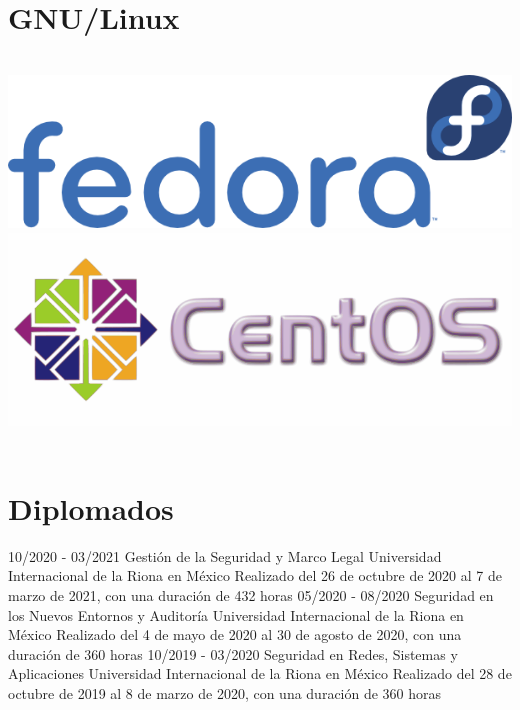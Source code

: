 \documentclass[]{friggeri-cv}
\begin{document}
\begin{aside}
    ~
    \section{GNU/Linux}
    ~
    \includegraphics[scale=0.12]{img/fedora}
    \includegraphics[scale=0.12]{img/centos}
    ~
\end{aside}
\section {Diplomados}
\begin{entrylist}
  \entry
  {10/2020 - 03/2021}
  {Gestión de la Seguridad y Marco Legal}
  {Universidad Internacional de la Riona en México}
  {Realizado del 26 de octubre de 2020 al 7 de marzo de 2021, con una duración de 432 horas}
  \entry
  {05/2020 - 08/2020}
  {Seguridad en los Nuevos Entornos y Auditoría}
  {Universidad Internacional de la Riona en México}
  {Realizado del 4 de mayo de 2020 al 30 de agosto de 2020, con una duración de 360 horas}
  \entry
  {10/2019 - 03/2020}
  {Seguridad en Redes, Sistemas y Aplicaciones}
  {Universidad Internacional de la Riona en México}
  {Realizado del 28 de octubre de 2019 al 8 de marzo de 2020, con una duración de 360 horas}
\end{entrylist}
\newpage
\end{document}
